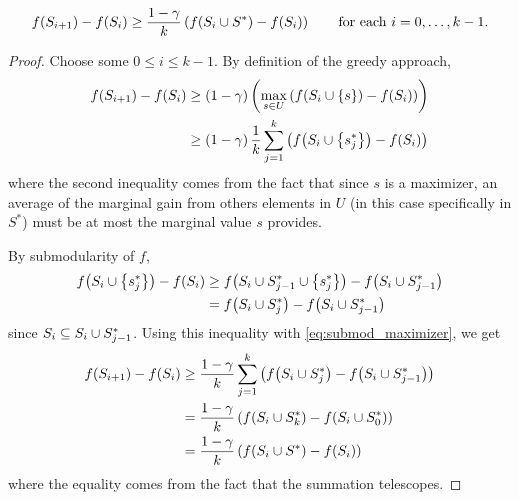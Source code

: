 \begin{claim}
    \begin{equation*}
        f \! \left( S_{i+1} \right) - f \! \left( S_i \right) \geq \frac{1-\gamma}{k} \left( f \! \left( S_i \cup S^{\ast} \right) - f \! \left( S_i \right) \right) 
        \quad \quad \textnormal{for each } i = 0, \ldots, k-1.
    \end{equation*}
    \label{claim:submod_ineq}
\end{claim}
\begin{proof} 
    Choose some $0 \leq i \leq k-1$. By definition of the greedy approach,
    \begin{align}
        \nonumber 
        f \! \left( S_{i+1} \right) - f \! \left( S_i \right) &\geq \left( 1-\gamma \right) \left( \max_{s \in U} \left( f \! \left( S_i \cup \left\{ s \right\} \right) - f \! \left( S_i \right) \right) \right)  \\
        \label{eq:submod_maximizer}                            
        &\geq \left( 1-\gamma \right) \frac{1}{k} \sum_{j=1}^{k} \left( f \! \left( S_i \cup \left\{ s_j^{\ast} \right\} \right) - f \! \left( S_i \right) \right)
    \end{align}
    where the second inequality comes from the fact that since $s$ is a maximizer, an average of the marginal gain from others elements in $U$ 
    (in this case specifically in $S^{\ast}$) must be at most the marginal value $s$ provides. 
    
    By submodularity of $f$, 
    \begin{align*}
        f \! \left( S_i \cup \left\{ s_j^{\ast} \right\} \right) - f \! \left( S_i \right) &\geq 
        f \! \left( S_i \cup S_{j-1}^{\ast} \cup  \left\{ s_j^{\ast} \right\} \right) - f \! \left( S_i \cup S_{j-1}^{\ast} \right) \\&= 
        f \! \left( S_i \cup  S_j^{\ast} \right) - f \! \left( S_i \cup S_{j-1}^{\ast} \right)
    \end{align*}
    since $S_i \subseteq S_i \cup S_{j-1}^{\ast}$. Using this inequality with \cref{eq:submod_maximizer}, we get
    \begin{align*}
        \f{S_{i+1}} - \f{S_i} &\geq \frac{1-\gamma}{k} \sum_{j=1}^{k} \lrp{\f{S_i \cup  S_j^{\ast}} - \f{S_i \cup S_{j-1}^{\ast}}}\\
        &= \frac{1-\gamma}{k} \lrp{\f{S_i \cup S_k^{\ast}} - \f{S_i \cup S_0^{\ast}}}\\
        &= \frac{1-\gamma}{k} \lrp{\f{S_i \cup S^{\ast}} - \f{S_i}}
    \end{align*}
    where the equality comes from the fact that the summation telescopes. 
\end{proof}


